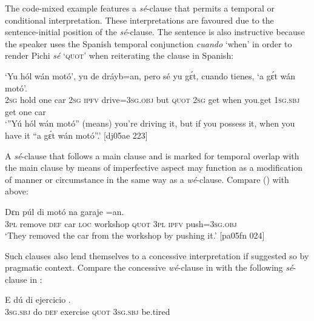 The code-mixed example  features a \textit{sé}{}-clause that permits a temporal or conditional interpretation. These interpretations are favoured due to the sentence-initial position of the \textit{sé}{}-clause. The sentence is also instructive because the speaker uses the Spanish temporal conjunction \textit{cuando} ‘when’ in order to render Pichi \textit{sé} ‘\textsc{quot}’ when reiterating the clause in Spanish:


\ea%
    \label{ex:key:1468}
    \gll ‘Yu  hól    wán  motó’,  yu  de  dráyb=an,  pero  sé    yu  gɛ́t,
cuando  tienes,  ‘a    gɛ́t  wán    motó’.\\
\textsc{2sg}  hold    one  car    \textsc{2sg}  \textsc{ipfv}  drive=\textsc{3sg.obj}  but    \textsc{quot}    \textsc{2sg}  get
when  you.get  \textsc{1sg.sbj}  get  one    car\\
\glt ‘”Yú hól wán motó” (means) you’re driving it, but if you possess it, 
when you have it “a gɛ́t wán motó”.’ [dj05ae 223]
\z

A \textit{sé}{}-clause that follows a main clause and is marked for temporal overlap with the main clause by means of imperfective aspect may function as a modification of manner or circumstance in the same way as a \textit{wé}{}-clause. Compare () with  above: 


\ea%
    \label{ex:key:1469}
    \gll Dɛn  púl    di  motó  na  garaje            =an.\\
\textsc{3pl}  remove  \textsc{def}  car    \textsc{loc}  workshop  \textsc{quot}    \textsc{3pl}  \textsc{ipfv}  push=\textsc{3sg.obj}\\

\glt ‘They removed the car from the workshop by pushing it.’ [pa05fn 024]
\z

Such clauses also lend themselves to a concessive interpretation if suggested so by pragmatic context. Compare the concessive \textit{wé}{}-clause in  with the following \textit{sé}{}-clause in :


\ea%
    \label{ex:key:1470}
    \gll E    dú  di  ejercicio            .\\
\textsc{3sg.sbj}  do  \textsc{def}  exercise    \textsc{quot}    3\textsc{sg.sbj}  be.tired\\

